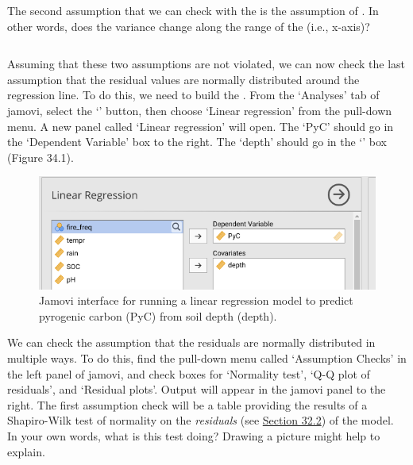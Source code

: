\documentclass[
  openany]{krantz}
\begin{document}
\begin{verbatim}

\end{verbatim}

The second assumption that we can check with the  is the assumption of .
In other words, does the variance change along the range of the  (i.e., x-axis)?

\begin{verbatim}

\end{verbatim}

Assuming that these two assumptions are not violated, we can now check the last assumption that the residual values are normally distributed around the regression line.
To do this, we need to build the .
From the `Analyses' tab of jamovi, select the `' button, then choose `Linear regression' from the pull-down menu.
A new panel called `Linear regression' will open.
The  `PyC' should go in the `Dependent Variable' box to the right.
The  `depth' should go in the `' box (Figure 34.1).

\begin{figure}
\includegraphics[width=1\linewidth]{img/Jamovi_linear_regression} \caption{Jamovi interface for running a linear regression model to predict pyrogenic carbon (PyC) from soil depth (depth).}\label{fig:unnamed-chunk-154}
\end{figure}

We can check the assumption that the residuals are normally distributed in multiple ways.
To do this, find the pull-down menu called `Assumption Checks' in the left panel of jamovi, and check boxes for `Normality test', `Q-Q plot of residuals', and `Residual plots'.
Output will appear in the jamovi panel to the right.
The first assumption check will be a table providing the results of a Shapiro-Wilk test of normality on the \emph{residuals} (see \protect\hyperlink{intercepts-slopes-and-residuals}{Section 32.2}) of the  model.
In your own words, what is this test doing?
Drawing a picture might help to explain.
\end{document}
